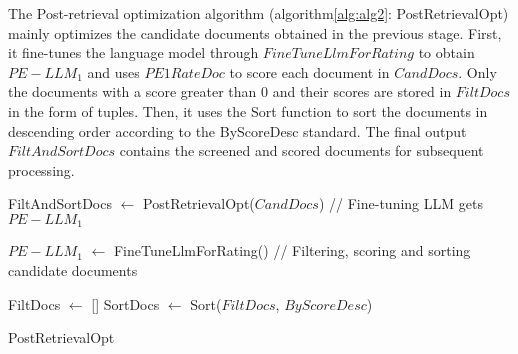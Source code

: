 The Post-retrieval optimization algorithm (algorithm\ref{alg:alg2}: PostRetrievalOpt) mainly optimizes the candidate documents obtained in the previous stage. First, it fine-tunes the language model through $FineTuneLlmForRating$ to obtain $PE-LLM_1$ and uses $PE1RateDoc$ to score each document in $CandDocs$. Only the documents with a score greater than 0 and their scores are stored in $FiltDocs$ in the form of tuples. Then, it uses the Sort function to sort the documents in descending order according to the ByScoreDesc standard. The final output $FiltAndSortDocs$ contains the screened and scored documents for subsequent processing.
\begin{algorithm}[h]
\label{alg:alg2}
\SetAlgoLined
{}
\BlankLine
FiltAndSortDocs $\leftarrow$ PostRetrievalOpt($CandDocs$)\;
\BlankLine
// {Fine-tuning LLM gets $PE-LLM_1$}

 $PE-LLM_1$ $\leftarrow$ FineTuneLlmForRating()\;
\BlankLine
// {Filtering, scoring and sorting candidate documents}

FiltDocs $\leftarrow$ []\;
\BlankLine
SortDocs $\leftarrow$ Sort($FiltDocs$, $ByScoreDesc$)\;
\;
\caption{ PostRetrievalOpt}
\end{algorithm}

